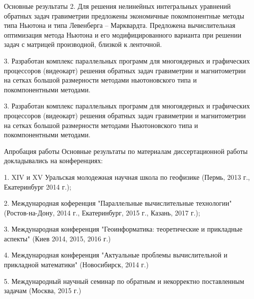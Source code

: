 \documentclass[10pt,pdf, mathserif, hyperref={unicode}]{beamer}
\begin{document}
\begin{frame}{Основные результаты}
	2. Для решения нелинейных интегральных уравнений обратных задач гравиметрии предложены экономичные покомпонентные методы 
	типа Ньютона и типа Левенберга – Марквардта. Предложена вычислительная оптимизация метода 
	Ньютона и его модифицированного варианта при решении задач 
	с матрицей производной, близкой к ленточной. 
	

	\vskip 0.5cm
	3. Разработан комплекс параллельных программ для многоядерных и графических процессоров (видеокарт) решения обратных задач гравиметрии и магнитометрии на сетках большой размерности методами ньютоновского типа и покомпонентными методами. 

	3. Разработан комплекс параллельных программ для многоядерных и графических процессоров (видеокарт) решения обратных задач гравиметрии и магнитометрии на сетках большой размерности методами Ньютоновского типа и покомпонентными методами. 

\end{frame}
	
\begin{frame}{Апробация работы}
	Основные результаты по материалам диссертационной работы докладывались на конференциях:
	
	
	1. XIV и XV Уральская молодежная научная школа по геофизике (Пермь, 2013 г., Екатеринбург 2014 г.);
	
	2. Международная коференция "Параллельные вычислительные технологии" (Ростов-на-Дону, 2014 г., Екатеринбург, 2015 г., Казань, 2017 г.);
	
	3. Международная конференция "Геоинформатика: теоретические и прикладные аспекты" (Киев 2014, 2015, 2016 г.)
	
	4. Международная конференция "Актуальные проблемы вычислительной и прикладной математики" (Новосибирск, 2014 г.)
	
	5. Международный научный семинар по обратным и некорректно поставленным задачам (Москва, 2015 г.)
\end{frame}
\end{document}
